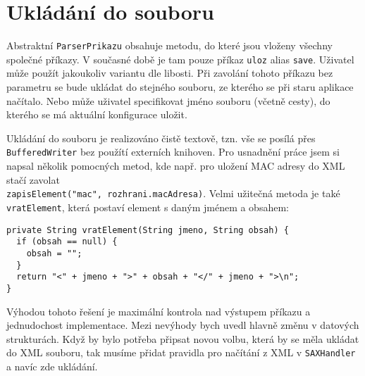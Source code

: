 \section{Ukládání do souboru}
Abstraktní \verb|ParserPrikazu| obsahuje metodu, do které jsou vloženy všechny společné příkazy. V současné době je tam pouze příkaz \verb|uloz| alias \verb|save|. Uživatel může použít jakoukoliv variantu dle libosti. Při zavolání tohoto příkazu bez parametru se bude ukládat do stejného souboru, ze kterého se při staru aplikace načítalo. Nebo může uživatel specifikovat jméno souboru (včetně cesty), do kterého se má aktuální konfigurace uložit. 

Ukládání do souboru je realizováno čistě textově, tzn. vše se posílá přes \verb|BufferedWriter| bez použítí externích knihoven. Pro usnadnění práce jsem si napsal několik pomocných metod, kde např. pro uložení MAC adresy do XML stačí zavolat \\\verb|zapisElement("mac", rozhrani.macAdresa)|. Velmi užitečná metoda je také \verb|vratElement|, která postaví element s daným jménem a obsahem:
\begin{verbatim}
private String vratElement(String jmeno, String obsah) {
  if (obsah == null) {
    obsah = "";
  }
  return "<" + jmeno + ">" + obsah + "</" + jmeno + ">\n";
}
\end{verbatim} 


Výhodou tohoto řešení je maximální kontrola nad výstupem příkazu a jednudochost implementace. Mezi nevýhody bych uvedl hlavně změnu v datových strukturách. Když by bylo potřeba připsat novou volbu, která by se měla ukládat do XML souboru, tak musíme přidat pravidla pro načítání z XML v \verb|SAXHandler| a navíc zde ukládání.


